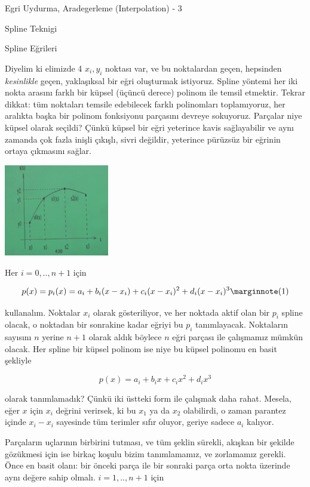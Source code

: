 \documentclass[12pt,fleqn]{article}\usepackage{../../common}
\begin{document}
Egri Uydurma, Aradegerleme (Interpolation) - 3

Spline Teknigi


Spline Eğrileri

Diyelim ki elimizde 4 $x_i,y_i$ noktası var, ve bu noktalardan geçen,
hepsinden {\em kesinlikle} geçen, yaklaşıksal bir eğri oluşturmak
istiyoruz. Spline yöntemi her iki nokta arasını farklı bir küpsel (üçüncü
derece) polinom ile temsil etmektir. Tekrar dikkat: tüm noktaları temsile
edebilecek farklı polinomları toplamıyoruz, her aralıkta başka bir polinom
fonksiyonu parçasını devreye sokuyoruz. Parçalar niye küpsel olarak
seçildi? Çünkü küpsel bir eğri yeterince kavis sağlayabilir ve aynı zamanda
çok fazla inişli çıkışlı, sivri değildir, yeterince pürüzsüz bir eğrinin
ortaya çıkmasını sağlar.

\includegraphics[height=4cm]{spline1.png}

Her $i=0,..,n+1$ için 

$$ p(x) = p_i(x) = a_i + b_i(x-x_i) + c_i(x-x_i)^2 + d_i(x-x_i)^3
\mlabel{1}
$$

kullanalım. Noktalar $x_i$ olarak gösteriliyor, ve her noktada aktif olan
bir $p_i$ spline olacak, o noktadan bir sonrakine kadar eğriyi bu $p_i$
tanımlayacak. Noktaların sayısını $n$ yerine $n+1$ olarak aldık böylece $n$
eğri parçası ile çalışmamız mümkün olacak. Her spline bir küpsel polinom ise
niye bu küpsel polinomu en basit şekliyle

$$ p(x) = a_i + b_ix + c_ix^2 + d_ix^3 $$

olarak tanımlamadık? Çünkü iki üstteki form ile çalışmak daha
rahat. Mesela, eğer $x$ için $x_i$ değrini verirsek, ki bu $x_1$ ya da
$x_2$ olabilirdi, o zaman parantez içinde $x_i - x_i$ sayesinde tüm 
terimler sıfır oluyor, geriye sadece $a_i$ kalıyor. 

Parçaların uçlarının birbirini tutması, ve tüm şeklin sürekli, akışkan bir
şekilde gözükmesi için ise birkaç koşulu bizim tanımlamamız, ve zorlamamız
gerekli. Önce en basit olanı: bir önceki parça ile bir sonraki parça
orta nokta üzerinde aynı değere sahip olmalı. $i=1,..,n+1$ için
\end{document}
